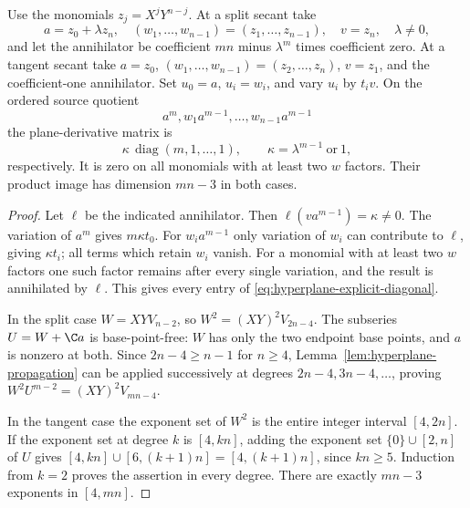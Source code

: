 \begin{lemma}
\label{lem:hyperplane-explicit-matrix}
Use the monomials $z_j=X^jY^{n-j}$. At a split secant take
\[
 a=z_0+\lambda z_n,\quad (w_1,\ldots,w_{n-1})=(z_1,\ldots,z_{n-1}),
 \quad v=z_n,\quad\lambda\ne0,
\]
and let the annihilator be coefficient $mn$ minus $\lambda^m$
times coefficient zero. At a tangent secant take $a=z_0$,
$(w_1,\ldots,w_{n-1})=(z_2,\ldots,z_n)$, $v=z_1$, and the
coefficient-one annihilator. Set $u_0=a$, $u_i=w_i$, and vary
$u_i$ by $t_i v$. On the ordered source quotient
\[
 a^m,w_1a^{m-1},\ldots,w_{n-1}a^{m-1}
\]
the plane-derivative matrix is
\begin{equation}\label{eq:hyperplane-explicit-diagonal}
       \kappa\,\operatorname{diag}(m,1,\ldots,1),\qquad
       \kappa=\lambda^{m-1}\ \text{or}\ 1,
\end{equation}
respectively. It is zero on all monomials with at least two $w$
factors. Their product image has dimension $mn-3$ in both cases.
\end{lemma}
\begin{proof}
Let $\ell$ be the indicated annihilator. Then
$\ell(va^{m-1})=\kappa\ne0$. The variation of $a^m$ gives
$m\kappa t_0$. For $w_i a^{m-1}$ only variation of $w_i$ can
contribute to $\ell$, giving $\kappa t_i$; all terms which retain
$w_i$ vanish. For a monomial with at least two $w$ factors one
such factor remains after every single variation, and the result
is annihilated by $\ell$. This gives every entry of
\eqref{eq:hyperplane-explicit-diagonal}.

In the split case $W=XYV_{n-2}$, so
$W^2=(XY)^2V_{2n-4}$. The subseries $U=W+\C a$ is
base-point-free: $W$ has only the two endpoint base points, and
$a$ is nonzero at both. Since $2n-4\ge n-1$ for $n\ge4$,
Lemma~\ref{lem:hyperplane-propagation} can be applied successively
at degrees $2n-4,3n-4,\ldots$, proving
$W^2U^{m-2}=(XY)^2V_{mn-4}$.

In the tangent case the exponent set of $W^2$ is the entire
integer interval $[4,2n]$. If the exponent set at degree $k$ is
$[4,kn]$, adding the exponent set $\{0\}\cup[2,n]$ of $U$
gives $[4,kn]\cup[6,(k+1)n]=[4,(k+1)n]$, since $kn\ge5$.
Induction from $k=2$ proves the assertion in every degree.
There are exactly $mn-3$ exponents in $[4,mn]$.
\end{proof}


